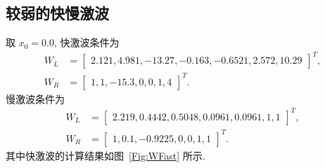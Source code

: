 \documentclass[10.5pt
]{article}
\begin{document}
\subsection{较弱的快慢激波}
取 $x_0 = 0.0$, 快激波条件为
\begin{align}
W_L &= \left[\begin{array}{cccccc}
2.121,
4.981,
-13.27,
-0.163,
-0.6521,
2.572,
10.29
\end{array}\right]^T,
\nonumber\\
W_R &= \left[\begin{array}{ccccccc}
1,
1,
-15.3,
0,
0,
1,
4
\end{array}\right]^T. \label{Eqn:WFast}
\end{align}
慢激波条件为
\begin{align}
W_L &= \left[\begin{array}{ccccccc}
2.219,
0.4442,
0.5048,
0.0961,
0.0961,
1,
1
\end{array}\right]^T,
\nonumber\\
W_R &= \left[\begin{array}{ccccccc}
1,
0.1,
-0.9225,
0,
0,
1,
1
\end{array}\right]^T.
\end{align}
其中快激波的计算结果如图~\ref{Fig:WFast} 所示.
\end{document}
